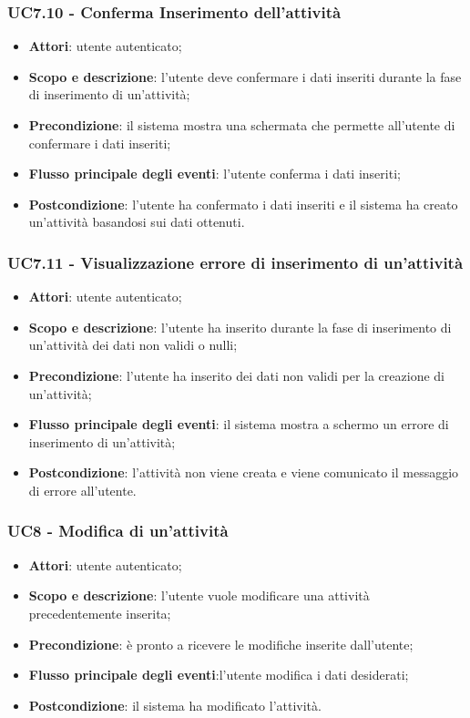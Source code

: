 \subsubsection{UC7.10 - Conferma Inserimento dell'attività}
\begin{itemize}
	\item \textbf{Attori}: utente autenticato;
	\item \textbf{Scopo e descrizione}: l’utente deve confermare i dati inseriti durante la fase di inserimento di un'attività;
	\item \textbf{Precondizione}: il sistema mostra una schermata che permette all’utente di confermare i dati inseriti;
	\item \textbf{Flusso principale degli eventi}: l’utente conferma i dati inseriti;
	\item \textbf{Postcondizione}: l’utente ha confermato i dati inseriti e il sistema ha creato un'attività basandosi sui dati ottenuti.
\end{itemize}

\subsubsection{UC7.11 - Visualizzazione errore di inserimento di un'attività}
\begin{itemize}
	\item \textbf{Attori}: utente autenticato;
	\item \textbf{Scopo e descrizione}: l’utente ha inserito durante la fase di inserimento di un'attività dei dati non validi o nulli;
	\item \textbf{Precondizione}: l’utente ha inserito dei dati non validi per la creazione di un'attività;
	\item \textbf{Flusso principale degli eventi}: il sistema mostra a schermo un errore di inserimento di un'attività;
	\item \textbf{Postcondizione}: l’attività non viene creata e viene comunicato il messaggio di errore all’utente.
\end{itemize}

\subsubsection{UC8 - Modifica di un'attività}
\begin{itemize}
	\item \textbf{Attori}: utente autenticato;
	\item \textbf{Scopo e descrizione}: l’utente vuole modificare una attività precedentemente inserita;
	\item \textbf{Precondizione}: è pronto a ricevere le modifiche inserite dall'utente;
	\item \textbf{Flusso principale degli eventi}:l'utente modifica i dati desiderati;
	\item \textbf{Postcondizione}: il sistema ha modificato l'attività.
\end{itemize}

